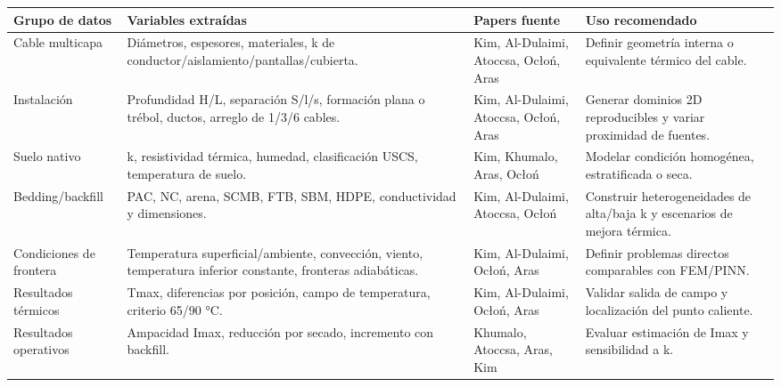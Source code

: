 \documentclass[11pt,a4paper,oneside]{report}
\begin{document}
\begin{longtable}[]{@{}
  >{\raggedright\arraybackslash}p{}
  >{\raggedright\arraybackslash}p{}
  >{\raggedright\arraybackslash}p{}
  >{\raggedright\arraybackslash}p{}@{}}
\toprule\noalign{}
\begin{minipage}[b]{\linewidth}\raggedright
Grupo de datos
\end{minipage} & \begin{minipage}[b]{\linewidth}\raggedright
Variables extraídas
\end{minipage} & \begin{minipage}[b]{\linewidth}\raggedright
Papers fuente
\end{minipage} & \begin{minipage}[b]{\linewidth}\raggedright
Uso recomendado
\end{minipage} \\
\midrule\noalign{}
\endhead
\bottomrule\noalign{}
\endlastfoot
Cable multicapa & Diámetros, espesores, materiales, k de
conductor/aislamiento/pantallas/cubierta. & Kim, Al-Dulaimi, Atoccsa,
Ocłoń, Aras & Definir geometría interna o equivalente térmico del
cable. \\
Instalación & Profundidad H/L, separación S/l/s, formación plana o
trébol, ductos, arreglo de 1/3/6 cables. & Kim, Al-Dulaimi, Atoccsa,
Ocłoń, Aras & Generar dominios 2D reproducibles y variar proximidad de
fuentes. \\
Suelo nativo & k, resistividad térmica, humedad, clasificación USCS,
temperatura de suelo. & Kim, Khumalo, Aras, Ocłoń & Modelar condición
homogénea, estratificada o seca. \\
Bedding/backfill & PAC, NC, arena, SCMB, FTB, SBM, HDPE, conductividad y
dimensiones. & Kim, Al-Dulaimi, Atoccsa, Ocłoń & Construir
heterogeneidades de alta/baja k y escenarios de mejora térmica. \\
Condiciones de frontera & Temperatura superficial/ambiente, convección,
viento, temperatura inferior constante, fronteras adiabáticas. & Kim,
Al-Dulaimi, Ocłoń, Aras & Definir problemas directos comparables con
FEM/PINN. \\
Resultados térmicos & Tmax, diferencias por posición, campo de
temperatura, criterio 65/90 °C. & Kim, Al-Dulaimi, Ocłoń, Aras & Validar
salida de campo y localización del punto caliente. \\
Resultados operativos & Ampacidad Imax, reducción por secado, incremento
con backfill. & Khumalo, Atoccsa, Aras, Kim & Evaluar estimación de Imax
y sensibilidad a k. \\
\end{longtable}
\end{document}

